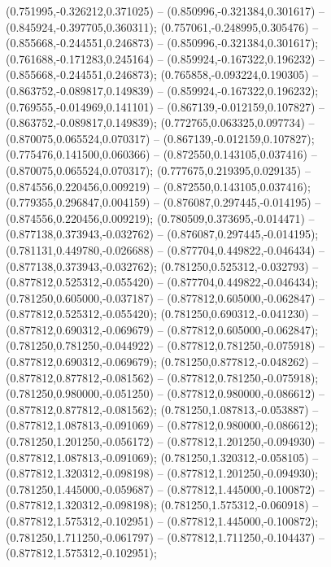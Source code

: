  (0.751995,-0.326212,0.371025) -- (0.850996,-0.321384,0.301617) -- (0.845924,-0.397705,0.360311);
 (0.757061,-0.248995,0.305476) -- (0.855668,-0.244551,0.246873) -- (0.850996,-0.321384,0.301617);
 (0.761688,-0.171283,0.245164) -- (0.859924,-0.167322,0.196232) -- (0.855668,-0.244551,0.246873);
 (0.765858,-0.093224,0.190305) -- (0.863752,-0.089817,0.149839) -- (0.859924,-0.167322,0.196232);
 (0.769555,-0.014969,0.141101) -- (0.867139,-0.012159,0.107827) -- (0.863752,-0.089817,0.149839);
 (0.772765,0.063325,0.097734) -- (0.870075,0.065524,0.070317) -- (0.867139,-0.012159,0.107827);
 (0.775476,0.141500,0.060366) -- (0.872550,0.143105,0.037416) -- (0.870075,0.065524,0.070317);
 (0.777675,0.219395,0.029135) -- (0.874556,0.220456,0.009219) -- (0.872550,0.143105,0.037416);
 (0.779355,0.296847,0.004159) -- (0.876087,0.297445,-0.014195) -- (0.874556,0.220456,0.009219);
 (0.780509,0.373695,-0.014471) -- (0.877138,0.373943,-0.032762) -- (0.876087,0.297445,-0.014195);
 (0.781131,0.449780,-0.026688) -- (0.877704,0.449822,-0.046434) -- (0.877138,0.373943,-0.032762);
 (0.781250,0.525312,-0.032793) -- (0.877812,0.525312,-0.055420) -- (0.877704,0.449822,-0.046434);
 (0.781250,0.605000,-0.037187) -- (0.877812,0.605000,-0.062847) -- (0.877812,0.525312,-0.055420);
 (0.781250,0.690312,-0.041230) -- (0.877812,0.690312,-0.069679) -- (0.877812,0.605000,-0.062847);
 (0.781250,0.781250,-0.044922) -- (0.877812,0.781250,-0.075918) -- (0.877812,0.690312,-0.069679);
 (0.781250,0.877812,-0.048262) -- (0.877812,0.877812,-0.081562) -- (0.877812,0.781250,-0.075918);
 (0.781250,0.980000,-0.051250) -- (0.877812,0.980000,-0.086612) -- (0.877812,0.877812,-0.081562);
 (0.781250,1.087813,-0.053887) -- (0.877812,1.087813,-0.091069) -- (0.877812,0.980000,-0.086612);
 (0.781250,1.201250,-0.056172) -- (0.877812,1.201250,-0.094930) -- (0.877812,1.087813,-0.091069);
 (0.781250,1.320312,-0.058105) -- (0.877812,1.320312,-0.098198) -- (0.877812,1.201250,-0.094930);
 (0.781250,1.445000,-0.059687) -- (0.877812,1.445000,-0.100872) -- (0.877812,1.320312,-0.098198);
 (0.781250,1.575312,-0.060918) -- (0.877812,1.575312,-0.102951) -- (0.877812,1.445000,-0.100872);
 (0.781250,1.711250,-0.061797) -- (0.877812,1.711250,-0.104437) -- (0.877812,1.575312,-0.102951);
